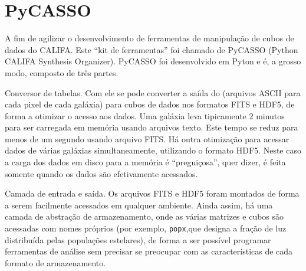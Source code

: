


\chapter{PyCASSO}
\label{sec:pycasso}

A fim de agilizar o desenvolvimento de ferramentas de manipulação de cubos de
dados do CALIFA. Este ``kit de ferramentas'' foi chamado de PyCASSO (Python
CALIFA \starlight Synthesis Organizer). PyCASSO foi desenvolvido em Pyton e é, a
grosso modo, composto de três partes.

Conversor de tabelas. Com ele se pode converter a saída do \starlight (arquivos
ASCII para cada pixel de cada galáxia) para cubos de dados nos formatos FITS e
HDF5, de forma a otimizar o acesso aos dados. Uma galáxia leva tipicamente 2
minutos para ser carregada em memória usando arquivos texto. Este tempo se reduz
para menos de um segundo usando arquivo FITS. Há outra otimização para acessar
dados de várias galáxias simultaneamente, utilizando o formato HDF5. Neste caso
a carga dos dados em disco para a memória é ``preguiçosa'', quer dizer, é feita
somente quando os dados são efetivamente acessados.

Camada de entrada e saída. Os arquivos FITS e HDF5 foram montados de forma a
serem facilmente acessados em qualquer ambiente. Ainda assim, há uma camada de
abstração de armazenamento, onde as várias matrizes e cubos são acessadas com
nomes próprios (por exemplo, \texttt{popx},que designa a fração de luz
distribuída pelas populações estelares), de forma a ser possível programar
ferramentas de análise sem precisar se preocupar com as características de cada
formato de armazenamento.

